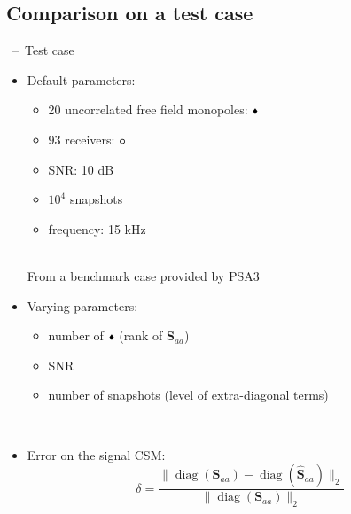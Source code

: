 \documentclass[10pt,xcolor=x11names,compress, notes=show]{beamer}%
\newcommand{\diag}[1]{\operatorname{diag}\left(#1\right)}
\begin{document}
\subsection{Comparison on a test case}
\begin{frame}{\insertsectionhead~--~Test case}
	
	\begin{itemize}
	\item Default parameters:
		\noindent\begin{minipage}{1.1\linewidth}
		     	\begin{minipage}{0.4\linewidth}		     		
	         			\begin{itemize}
					\item 20  uncorrelated free field monopoles: \textcolor{red}{$\vcenter{\hbox{\tiny$\blacklozenge$}}$}
					\item 93 receivers: \textcolor{colorAlice}{$\vcenter{\hbox{\small$\bm{\circ}$}}$}
					\item SNR: 10 dB
					\item $10^4$ snapshots
					\item frequency: 15 kHz
				\end{itemize}	
	               		\vfill
	     		\end{minipage}
	      		\hspace{0.5cm}
	     		 \begin{minipage}{0.5\linewidth}
             			\centering
             			\vspace{-0.5cm}
				\\
				{\scriptsize \textcolor{black!50}{\hspace{0.5cm} From a benchmark case provided by PSA3}\vspace{-1cm}
}
	      		\end{minipage}
		\end{minipage}
	
	\item Varying parameters: \\
	\begin{itemize}
	        \item number of   \textcolor{red}{$\vcenter{\hbox{\tiny$\blacklozenge$}}$} (rank of $\bm{S}_{aa}$)\\[3pt]
	        \item SNR\\[3pt]
	        \item number of snapshots (level of extra-diagonal terms)
\end{itemize}~\\	
	
	\item Error on the signal CSM:
	\begin{equation*}
   		 \delta = \frac{\|\diag{\bm{S}_{aa}}  - \diag{\bm{\hat{S}}_{aa}}\|_2}{\|\diag{\bm{S}_{aa} } \|_2}
	\end{equation*}
	\end{itemize}

\end{frame}
\end{document}
